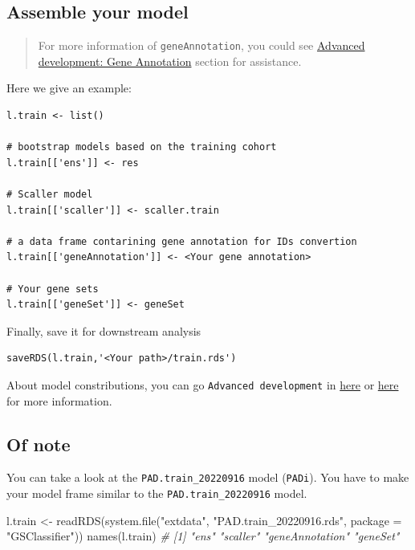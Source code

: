 \documentclass[
  12pt,
]{book}
\newenvironment{Shaded}{\begin{snugshade}}{\end{snugshade}}
\newcommand{\AttributeTok}[1]{\textcolor[rgb]{0.77,0.63,0.00}{#1}}
\newcommand{\CommentTok}[1]{\textcolor[rgb]{0.56,0.35,0.01}{\textit{#1}}}
\newcommand{\FunctionTok}[1]{\textcolor[rgb]{0.00,0.00,0.00}{#1}}
\newcommand{\NormalTok}[1]{#1}
\newcommand{\OtherTok}[1]{\textcolor[rgb]{0.56,0.35,0.01}{#1}}
\newcommand{\StringTok}[1]{\textcolor[rgb]{0.31,0.60,0.02}{#1}}
\begin{document}
\hypertarget{assemble-your-model}{%
\subsection{Assemble your model}\label{assemble-your-model}}

\begin{quote}
For more information of \texttt{geneAnnotation}, you could see \href{https://github.com/huangwb8/GSClassifier/wiki/Advanced-development\#Gene-Annotation}{Advanced development: Gene Annotation} section for assistance.
\end{quote}

Here we give an example:

\begin{verbatim}
l.train <- list()

# bootstrap models based on the training cohort
l.train[['ens']] <- res 

# Scaller model
l.train[['scaller']] <- scaller.train 

# a data frame contarining gene annotation for IDs convertion
l.train[['geneAnnotation']] <- <Your gene annotation>

# Your gene sets
l.train[['geneSet']] <- geneSet
\end{verbatim}

Finally, save it for downstream analysis

\begin{verbatim}
saveRDS(l.train,'<Your path>/train.rds')
\end{verbatim}

About model constributions, you can go \texttt{Advanced\ development} in \href{https://github.com/huangwb8/GSClassifier/wiki/Advanced-development}{here} or \href{http://htmlpreview.github.io/?https://raw.githubusercontent.com/wiki/huangwb8/GSClassifier/Advanced-development.html}{here} for more information.

\hypertarget{of-note-2}{%
\subsection{Of note}\label{of-note-2}}

You can take a look at the \texttt{PAD.train\_20220916} model (\texttt{PADi}). You have to make your model frame similar to the \texttt{PAD.train\_20220916} model.

\begin{Shaded}
\begin{Highlighting}[]
\NormalTok{l.train }\OtherTok{\textless{}{-}} \FunctionTok{readRDS}\NormalTok{(}\FunctionTok{system.file}\NormalTok{(}\StringTok{"extdata"}\NormalTok{, }\StringTok{"PAD.train\_20220916.rds"}\NormalTok{, }\AttributeTok{package =} \StringTok{"GSClassifier"}\NormalTok{))}
\FunctionTok{names}\NormalTok{(l.train)}
\CommentTok{\# [1] "ens"            "scaller"        "geneAnnotation" "geneSet"}
\end{Highlighting}
\end{Shaded}
\end{document}

